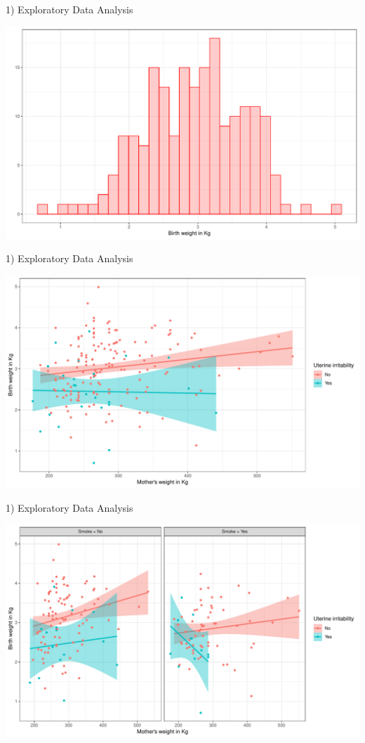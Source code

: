 \documentclass[ignorenonframetext,a4paper]{beamer}
\begin{document}
\begin{frame}{1) Exploratory Data Analysis}

\includegraphics{DB_presentation_slides_files/figure-beamer/unnamed-chunk-2-1.pdf}

\end{frame}

\begin{frame}{1) Exploratory Data Analysis}

\includegraphics{DB_presentation_slides_files/figure-beamer/unnamed-chunk-3-1.pdf}

\end{frame}

\begin{frame}{1) Exploratory Data Analysis}

\includegraphics{DB_presentation_slides_files/figure-beamer/unnamed-chunk-4-1.pdf}

\end{frame}
\end{document}
